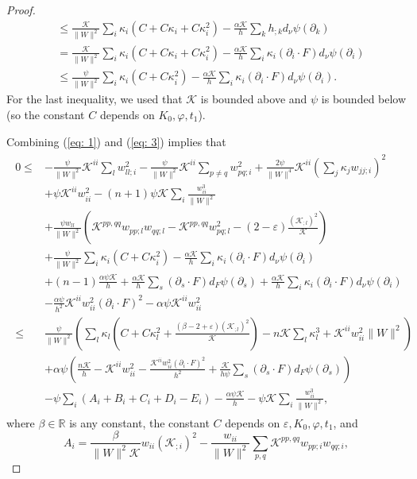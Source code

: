 \documentclass{amsart}
\theoremstyle{definition}
\theoremstyle{remark}
\numberwithin{equation}{section}
\begin{document}
\begin{proof}
\begin{align}
&\leq \frac{\mathcal{K}}{\|W\|^2}\sum_i \kappa_i(C+C\kappa_i+C\kappa_i^2)-\frac{\alpha\mathcal{K}}{h} \sum_k h_{;k} d_{\nu}\psi(\partial_k)\nonumber\\
&=\frac{\mathcal{K}}{\|W\|^2}\sum_i \kappa_i(C+C\kappa_i+C\kappa_i^2)-\frac{\alpha\mathcal{K}}{h}\sum_i \kappa_i(\partial_i\cdot F) d_{\nu}\psi(\partial_i)\nonumber\\
&\leq \frac{\psi}{\|W\|^2}\sum_i \kappa_i(C+C\kappa_i^2)-\frac{\alpha\mathcal{K}}{h}\sum_i \kappa_i (\partial_i \cdot F) d_{\nu}\psi(\partial_i).
\end{align}
For the last inequality, we used that $\mathcal{K}$ is bounded above and $\psi$ is bounded below (so the constant $C$ depends on $K_0,\varphi, t_1$).

Combining  (\ref{eq: 1}) and (\ref{eq: 3}) implies that
\begin{align}\begin{split}\label{eq:L10-1}
0\leq& -\frac{\psi}{\|W\|^2}\mathcal{K}^{ii}\sum_lw_{ll;i}^2-\frac{\psi}{\|W\|^2}\mathcal{K}^{ii}\sum_{p\ne q}w_{pq;i}^2
+\frac{2\psi}{\|W\|^4}\mathcal{K}^{ii}\left(\sum_j\kappa_jw_{jj;i}\right)^2\\
&+\psi\mathcal{K}^{ii}w_{ii}^2-(n+1)\psi\mathcal{K}\sum_i\frac{w_{ii}^3}{\|W\|^2}\\
&+\frac{\psi w_{ll}}{\|W\|^2}\left(\mathcal{K}^{pp,qq}w_{pp;l}w_{qq;l}-\mathcal{K}^{pp,qq}w_{pq;l}^2
-(2-\varepsilon)\frac{(\mathcal{K}_{;l})^2}{\mathcal{K}}\right)\\
&+\frac{\psi}{\|W\|^2}\sum_i \kappa_i(C+C\kappa_i^2)-\frac{\alpha\mathcal{K}}{h}\sum_i \kappa_i(\partial_i\cdot F) d_{\nu}\psi(\partial_i)\\
&+(n-1)\frac{\alpha\psi\mathcal{K}}{h}+\frac{\alpha\mathcal{K}}{h}\sum_s(\partial_s\cdot F) d_F\psi(\partial_s)+\frac{\alpha\mathcal{K}}{h}\sum_i\kappa_i(\partial_i\cdot F) d_{\nu}\psi(\partial_i)\\
&-\frac{\alpha\psi}{h^2}\mathcal{K}^{ii}w_{ii}^2(\partial_i\cdot F)^2 -\alpha\psi\mathcal{K}^{ii}w_{ii}^2\\
\leq&\frac{\psi}{\|W\|^2}\left(\sum_l\kappa_l\left(C+C\kappa_l^2+\frac{(\beta
-2+\varepsilon)(\mathcal{K}_{;l})^2}{\mathcal{K}}\right)-n\mathcal{K}\sum_l\kappa_l^3+\mathcal{K}^{ii}w_{ii}^2\|W\|^2\right)\\
&+\alpha\psi\left(\frac{n\mathcal{K}}{h}-\mathcal{K}^{ii}w_{ii}^2-\frac{\mathcal{K}^{ii}w_{ii}^2(\partial_i\cdot F)^2}{h^2}+\frac{\mathcal{K}}{h\psi}\sum_s(\partial_s\cdot F) d_F\psi(\partial_s)\right)\\
&-\psi\sum_i\left(A_i+B_i+C_i+D_i-E_i\right)
-\frac{\alpha\psi\mathcal{K}}{h}-\psi\mathcal{K}\sum_i\frac{w_{ii}^3}{\|W\|^2},
\end{split}\end{align}
where $\beta \in \mathbb{R}$ is any constant, the constant $C$ depends on $\varepsilon,K_0,\varphi,t_1$, and
\[A_i=\frac{\beta}{\|W\|^2\mathcal{K}} w_{ii}(\mathcal{K}_{;i})^2-\frac{w_{ii}}{\|W\|^2}\sum_{p,q}\mathcal{K}^{pp,qq}w_{pp;i}w_{qq;i},\]


\end{proof}
\end{document}
